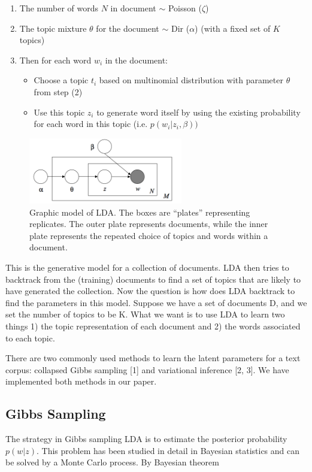 \documentclass{article} %
\begin{document}
\begin{enumerate}
\item The number of words $N$ in document $\sim$ Poisson ($\zeta$)
\item The topic mixture $\theta$ for the document $\sim$ Dir ($\alpha$) (with a fixed set of $K$ topics)
\item Then for each word $w_i$ in the document:
\begin{itemize}
\item Choose a topic $t_i$ based on multinomial distribution with parameter $\theta$ from step (2)
\item Use this topic $z_i$ to generate word itself by using the existing probability for each word in this topic (i.e. $p(w_i | z_i, \beta))$
\end{itemize}
\end{enumerate}

\begin{figure}
    \centering
    \includegraphics[width=0.6\textwidth]{graphmodel}
    \caption{Graphic model of LDA. The boxes are ``plates'' representing replicates. The outer plate represents documents, while the inner plate represents the repeated choice of topics and words within a document.}
    \label{fig:graphmodel}
\end{figure}


This is the generative model for a collection of documents. LDA then tries to backtrack from the (training) documents to find a set of topics that are likely to have generated the collection. Now the question is how does LDA backtrack to find the parameters in this model. Suppose we have a set of documents D, and we set the number of topics to be K. What we want is to use LDA to learn two things 1) the topic representation of each document and 2) the words associated to each topic.

There are two commonly used methods to learn the latent parameters for a text corpus: collapsed Gibbs sampling [1] and variational inference [2, 3]. We have implemented both methods in our paper.

\subsection{Gibbs Sampling}
The strategy in Gibbs sampling LDA is to estimate the posterior probability $p(w | z)$. This problem has been studied in detail in Bayesian statistics and can be solved by a Monte Carlo process. By Bayesian theorem
\end{document}

